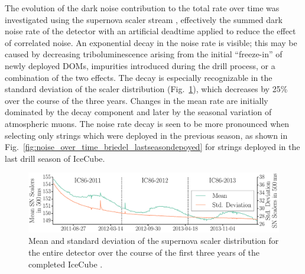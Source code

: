 The evolution of the dark noise contribution to the total rate over time was investigated using the
supernova scaler stream \cite{IC3:supernova, briedel_phd}, effectively 
the summed dark noise rate of the detector with an artificial deadtime
applied to reduce the effect of correlated noise. An exponential decay in
the noise rate is visible; this may be caused by 
decreasing triboluminescence arising from the initial ``freeze-in''
of newly deployed DOMs, impurities introduced during the drill
process, or a combination of the two effects.  The decay
is especially recognizable in the standard deviation of the scaler
distribution (Fig.~\ref{fig:noise_over_time_briedel}), which decreases by
25\% over the course of the three years. Changes in the mean rate are
initially dominated by the decay component and later by the seasonal
variation of atmospheric muons. The noise
rate decay is seen to be more pronounced when selecting only strings
which were deployed in the previous season, as shown in Fig.~\ref{fig:noise_over_time_briedel_lastseasondepoyed} for strings deployed in the last drill season of IceCube.


\begin{figure}[!h]
 \centering
 \includegraphics[width=1.0\textwidth]{graphics/dom/performance/darknoise/SN_Scalers_Whole_Detector_Mean_Variance_IC86_2011_2012_2013_smaller_height.pdf}
 \caption{Mean and standard deviation of the supernova scaler distribution for the
   entire detector over the course of the first three years of the
   completed IceCube \cite{briedel_phd}.} 
 \label{fig:noise_over_time_briedel}
\end{figure}

